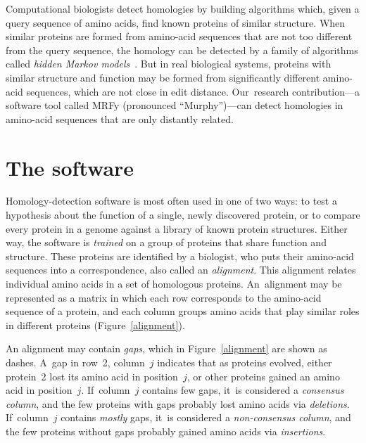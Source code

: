 \documentclass[preprint,nonatbib,blockstyle,nocopyrightspace,times]{sigplanconf}
\newcommand\figref[1]{Figure~\ref{#1}}
\newcommand\secref[1]{Section~\ref{sec:#1}}
\let\cite\citep
\begin{document}
Computational biologists detect homologies by building 
algorithms which, given a {query sequence} of amino acids,
find known proteins of similar structure.
When similar proteins are formed from amino-acid sequences that
are not too different from the query sequence, the homology can be
detected by
a family of algorithms called 
\textit{hidden Markov models}~\cite{Eddy:1998ut}.
But in real biological systems,
proteins with similar structure and function may be formed from significantly 
different amino-acid sequences, which are not close in edit distance.
Our~research contribution---a software tool called MRFy (pronounced
``Murphy'')---can detect homologies 
in amino-acid sequences that are only distantly related.
%
%

%
%
%


\section{The software}



Homology-detection software is most often used in one of two ways:
to test a hypothesis about 
the function of a single, newly discovered protein, or 
to compare every protein in a genome against a library of known protein 
structures.
Either way, 
the software is \emph{trained}
on a group of proteins that share function and structure.
These proteins are identified by a biologist, who puts
their amino-acid sequences into a correspondence, also called an
\emph{alignment}. 
This alignment relates individual amino acids in a set of homologous proteins.
An~alignment may be represented as a matrix
in which each row corresponds to the amino-acid sequence of a protein,
and each column groups amino acids that play similar roles in
different proteins (Figure~\ref{alignment}).


An alignment may contain \emph{gaps}, which in 
\figref{alignment} are shown as dashes.
A~gap in row~2, column~$j$ indicates that as proteins evolved, either 
protein~2 lost its amino acid in position~$j$, or 
other proteins gained an amino acid in position~$j$.
If~column~$j$ contains few gaps, 
it~is considered a \emph{consensus column},
and the few proteins with gaps probably lost amino acids via
\emph{deletions}.
If~column~$j$ contains \emph{mostly} gaps, 
it~is considered a \emph{non-consensus column},
and the few proteins without gaps probably gained amino acids via
\emph{insertions}. 
\end{document}
